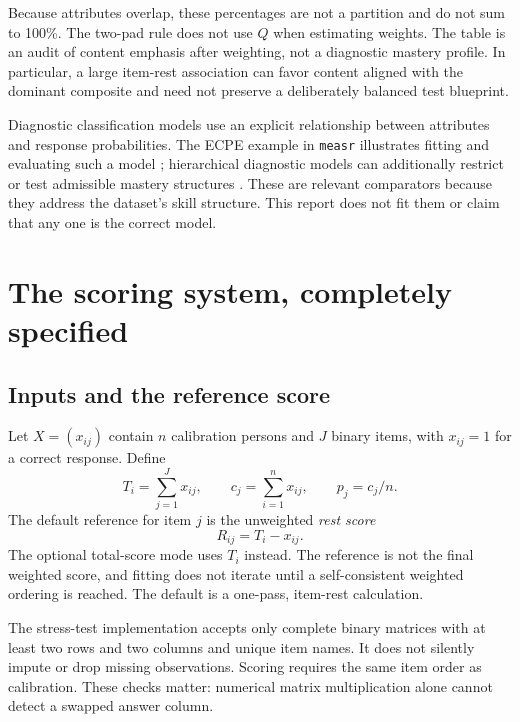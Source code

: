 \documentclass[11pt,a4paper,oneside,headings=normal,parskip=half]{scrreprt}
\newcommand{\code}[1]{\nolinkurl{#1}}
\begin{document}
Because attributes overlap, these percentages are not a partition and do not sum to 100\%. The two-pad rule does not use $Q$ when estimating weights. The table is an audit of content emphasis after weighting, not a diagnostic mastery profile. In particular, a large item-rest association can favor content aligned with the dominant composite and need not preserve a deliberately balanced test blueprint.

Diagnostic classification models use an explicit relationship between attributes and response probabilities. The ECPE example in \code{measr} illustrates fitting and evaluating such a model \citep{measrecpe}; hierarchical diagnostic models can additionally restrict or test admissible mastery structures \citep{templinbradshaw}. These are relevant comparators because they address the dataset's skill structure. This report does not fit them or claim that any one is the correct model.

\chapter{The scoring system, completely specified}\label{ch:formula}
\section{Inputs and the reference score}
Let $X=(x_{ij})$ contain $n$ calibration persons and $J$ binary items, with $x_{ij}=1$ for a correct response. Define
\begin{equation}
T_i=\sum_{j=1}^{J}x_{ij},\qquad c_j=\sum_{i=1}^{n}x_{ij},\qquad p_j=c_j/n.
\end{equation}
The default reference for item $j$ is the unweighted \emph{rest score}
\begin{equation}
R_{ij}=T_i-x_{ij}.
\end{equation}
The optional total-score mode uses $T_i$ instead. The reference is not the final weighted score, and fitting does not iterate until a self-consistent weighted ordering is reached. The default is a one-pass, item-rest calculation.

The stress-test implementation accepts only complete binary matrices with at least two rows and two columns and unique item names. It does not silently impute or drop missing observations. Scoring requires the same item order as calibration. These checks matter: numerical matrix multiplication alone cannot detect a swapped answer column.
\end{document}
